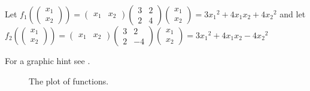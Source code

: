 \documentclass[ComputationalMathematics.tex]{subfiles}
\begin{document}
\begin{example}
  Let $f_1(\begin{pmatrix} x_1\\ x_2 \end{pmatrix}) = \begin{pmatrix} x_1 & x_2 \end{pmatrix} \begin{pmatrix} 3 & 2 \\ 2 & 4 \end{pmatrix}\begin{pmatrix} x_1\\ x_2 \end{pmatrix} = 3 {x_1}^2 + 4 x_1 x_2 + 4 {x_2}^2$ and let $f_2(\begin{pmatrix} x_1\\ x_2 \end{pmatrix}) = \begin{pmatrix} x_1 & x_2 \end{pmatrix} \begin{pmatrix} 3 & 2 \\ 2 & -4 \end{pmatrix}\begin{pmatrix} x_1\\ x_2 \end{pmatrix} = 3 {x_1}^2 + 4 x_1 x_2 -4 {x_2}^2$

For a graphic hint see .

\begin{figure}[h!]
	\centering\scriptsize
	\hspace*{\fill}
   \hfill
   \hspace*{\fill}
	\caption{The plot of functions.}\label{fig:26sett_quadratic}
\end{figure}

\end{example}
\end{document}
